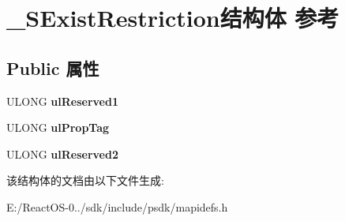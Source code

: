 \hypertarget{struct___s_exist_restriction}{}\section{\+\_\+\+S\+Exist\+Restriction结构体 参考}
\label{struct___s_exist_restriction}
\subsection*{Public 属性}
\begin{DoxyCompactItemize}
\item 
\mbox{\label{struct___s_exist_restriction_a2f5a45984db4e759bec886e4ddc61056}} 
U\+L\+O\+NG {\bfseries ul\+Reserved1}
\item 
\mbox{\label{struct___s_exist_restriction_ab0869a4f2dfc97b3fa6b11b391905a67}} 
U\+L\+O\+NG {\bfseries ul\+Prop\+Tag}
\item 
\mbox{\label{struct___s_exist_restriction_af003e2e577ffdab6650d564e6be91a8a}} 
U\+L\+O\+NG {\bfseries ul\+Reserved2}
\end{DoxyCompactItemize}


该结构体的文档由以下文件生成\+:\begin{DoxyCompactItemize}
\item 
E\+:/\+React\+O\+S-\/0../sdk/include/psdk/mapidefs.\+h\end{DoxyCompactItemize}
